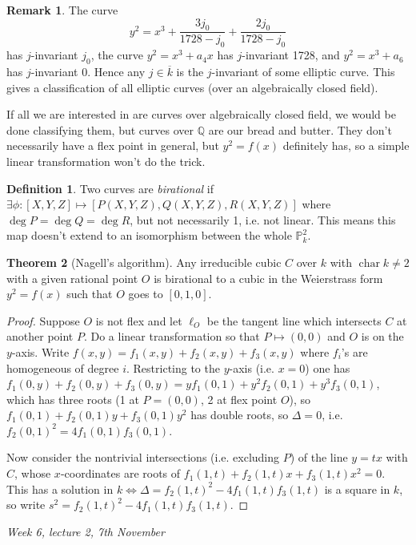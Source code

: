 \documentclass{article}
\newcommand{\Q}{\mathbb{Q}}
\newcommand{\p}{\mathbb{P}}
\newcommand{\Char}{\operatorname{char}}
\theoremstyle{definition}
\newtheorem{defn}{Definition}[subsection]
\newtheorem{thm}[defn]{Theorem}
\newtheorem*{remark}{Remark}
\begin{document}
\begin{remark}
The curve
\[
y^2=x^3+\frac{3j_0}{1728-j_0}+\frac{2j_0}{1728-j_0}
\]
has $j$-invariant $j_0$, the curve $y^2=x^3+a_4x$ has $j$-invariant 1728, and $y^2=x^3+a_6$ has $j$-invariant 0. Hence any $j\in\overline k$ is the $j$-invariant of some elliptic curve. This gives a classification of all elliptic curves (over an algebraically closed field).
\end{remark}

If all we are interested in are curves over algebraically closed field, we would be done classifying them, but curves over $\Q$ are our bread and butter. They don't necessarily have a flex point in general, but $y^2=f(x)$ definitely has, so a simple linear transformation won't do the trick.

\begin{defn}
Two curves are \textit{birational} if $\exists\phi:[X,Y,Z]\mapsto[P(X,Y,Z),Q(X,Y,Z),R(X,Y,Z)]$ where $\deg P=\deg Q=\deg R$, but not necessarily 1, i.e. not linear. This means this map doesn't extend to an isomorphism between the whole $\p^2_k$.
\end{defn}

\begin{thm}[Nagell's algorithm]
Any irreducible cubic $C$ over $k$ with $\Char k\neq 2$ with a given rational point $O$ is birational to a cubic in the Weierstrass form $y^2=f(x)$ such that $O$ goes to $[0,1,0]$.
\end{thm}
\begin{proof}
Suppose $O$ is not flex and let $\ell_O$ be the tangent line which intersects $C$ at another point $P$. Do a linear transformation so that $P\mapsto (0,0)$ and $O$ is on the $y$-axis. Write $f(x,y)=f_1(x,y)+f_2(x,y)+f_3(x,y)$ where $f_i$'s are homogeneous of degree $i$. Restricting to the $y$-axis (i.e. $x=0$) one has $f_1(0,y)+f_2(0,y)+f_3(0,y)=yf_1(0,1)+y^2f_2(0,1)+y^3f_3(0,1)$, which has three roots (1 at $P=(0,0)$, 2 at flex point $O$), so $f_1(0,1)+f_2(0,1)y+f_3(0,1)y^2$ has double roots, so $\Delta=0$, i.e. $f_2(0,1)^2=4f_1(0,1)f_3(0,1)$.

Now consider the nontrivial intersections (i.e. excluding $P$) of the line $y=tx$ with $C$, whose $x$-coordinates are roots of $f_1(1,t)+f_2(1,t)x+f_3(1,t)x^2=0$. This has a solution in $k\iff\Delta=f_2(1,t)^2-4f_1(1,t)f_3(1,t)$ is a square in $k$, so write $s^2=f_2(1,t)^2-4f_1(1,t)f_3(1,t)$.
\end{proof}

\begin{flushright}
\textit{Week 6, lecture 2, 7th November}
\end{flushright}
\end{document}
